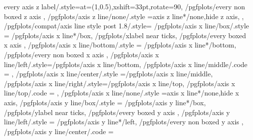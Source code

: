 {{{{				every axis z label/.style={at={(1,0.5)},xshift=33pt,rotate=90},
				/pgfplots/every non boxed z axis
			}%
		},%
		/pgfplots/axis z line/none/.style	={axis z line*/none,hide z axis},
	},
	/pgfplots/compat/axis line style post 1.8/.style={%
		/pgfplots/axis x line/box/.style	={
			/pgfplots/axis x line*/box,
			/pgfplots/xlabel near ticks,
			/pgfplots/every boxed x axis
		},
		/pgfplots/axis x line/bottom/.style	={
			/pgfplots/axis x line*/bottom,
			/pgfplots/every non boxed x axis
		},
		/pgfplots/axis x line/left/.style={/pgfplots/axis x line/bottom},%
		/pgfplots/axis x line/middle/.code	={%
			\ifnum{} %
			\else
			\fi
		},
		/pgfplots/axis x line/center/.style	={/pgfplots/axis x line/middle},
		/pgfplots/axis x line/right/.style={/pgfplots/axis x line/top},%
		/pgfplots/axis x line/top/.code	={
			\ifnum{} %
			\fi
		},
		/pgfplots/axis x line/none/.style	={axis x line*/none,hide x axis},
		/pgfplots/axis y line/box/.style	={
			/pgfplots/axis y line*/box,
			/pgfplots/ylabel near ticks,
			/pgfplots/every boxed y axis
		},
		/pgfplots/axis y line/left/.style	={
			/pgfplots/axis y line*/left,
			/pgfplots/every non boxed y axis
		},
		/pgfplots/axis y line/center/.code	={
			\ifnum{} %
}}}
